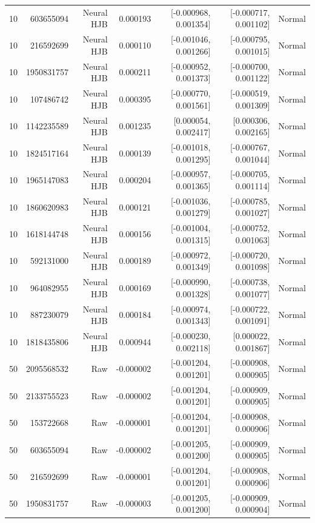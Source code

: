 \begin{longtable}{lrrrrrr}
10 & 603655094 & Neural HJB & 0.000193 & [-0.000968, 0.001354] & [-0.000717, 0.001102] & Normal \\
10 & 216592699 & Neural HJB & 0.000110 & [-0.001046, 0.001266] & [-0.000795, 0.001015] & Normal \\
10 & 1950831757 & Neural HJB & 0.000211 & [-0.000952, 0.001373] & [-0.000700, 0.001122] & Normal \\
10 & 107486742 & Neural HJB & 0.000395 & [-0.000770, 0.001561] & [-0.000519, 0.001309] & Normal \\
10 & 1142235589 & Neural HJB & 0.001235 & [0.000054, 0.002417] & [0.000306, 0.002165] & Normal \\
10 & 1824517164 & Neural HJB & 0.000139 & [-0.001018, 0.001295] & [-0.000767, 0.001044] & Normal \\
10 & 1965147083 & Neural HJB & 0.000204 & [-0.000957, 0.001365] & [-0.000705, 0.001114] & Normal \\
10 & 1860620983 & Neural HJB & 0.000121 & [-0.001036, 0.001279] & [-0.000785, 0.001027] & Normal \\
10 & 1618144748 & Neural HJB & 0.000156 & [-0.001004, 0.001315] & [-0.000752, 0.001063] & Normal \\
10 & 592131000 & Neural HJB & 0.000189 & [-0.000972, 0.001349] & [-0.000720, 0.001098] & Normal \\
10 & 964082955 & Neural HJB & 0.000169 & [-0.000990, 0.001328] & [-0.000738, 0.001077] & Normal \\
10 & 887230079 & Neural HJB & 0.000184 & [-0.000974, 0.001343] & [-0.000722, 0.001091] & Normal \\
10 & 1818435806 & Neural HJB & 0.000944 & [-0.000230, 0.002118] & [0.000022, 0.001867] & Normal \\
50 & 2095568532 & Raw & -0.000002 & [-0.001204, 0.001201] & [-0.000908, 0.000905] & Normal \\
50 & 2133755523 & Raw & -0.000002 & [-0.001204, 0.001201] & [-0.000909, 0.000905] & Normal \\
50 & 153722668 & Raw & -0.000001 & [-0.001204, 0.001201] & [-0.000908, 0.000906] & Normal \\
50 & 603655094 & Raw & -0.000002 & [-0.001205, 0.001200] & [-0.000909, 0.000905] & Normal \\
50 & 216592699 & Raw & -0.000001 & [-0.001204, 0.001201] & [-0.000908, 0.000906] & Normal \\
50 & 1950831757 & Raw & -0.000003 & [-0.001205, 0.001200] & [-0.000909, 0.000904] & Normal \\

\end{longtable}
